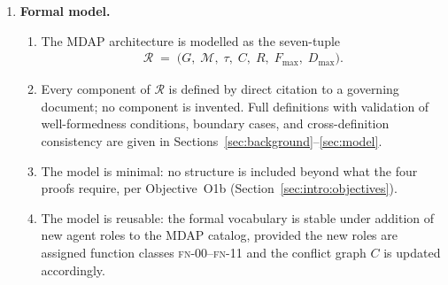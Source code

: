\documentclass[12pt]{article}
\theoremstyle{definition}
\newcommand{\FN}[1]{\textsc{fn-#1}}
\begin{document}
\begin{enumerate}
    \item \textbf{Formal model.}
    \begin{enumerate}
        \item[(3.1)] The MDAP architecture is modelled as the
              seven-tuple
              \begin{align}
                \mathcal{R}
                \;=\;
                \bigl(G,\;\mathcal{M},\;\tau,\;C,\;R,\;
                       F_{\max},\;D_{\max}\bigr).
              \end{align}
        \item[(3.2)] Every component of $\mathcal{R}$ is defined
              by direct citation to a governing document; no component
              is invented.
              Full definitions with validation of well-formedness
              conditions, boundary cases, and cross-definition
              consistency are given in
              Sections~\ref{sec:background}--\ref{sec:model}.
        \item[(3.3)] The model is minimal: no structure is included
              beyond what the four proofs require, per Objective~O1b
              (Section~\ref{sec:intro:objectives}).
        \item[(3.4)] The model is reusable: the formal vocabulary is
              stable under addition of new agent roles to the MDAP
              catalog, provided the new roles are assigned function
              classes \FN{00}--\FN{11} and the conflict graph $C$ is
              updated accordingly.
    \end{enumerate}


\end{enumerate}
\end{document}
